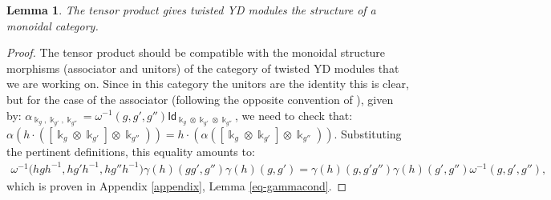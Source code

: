 \documentclass[pdftex]{sigma}
\numberwithin{equation}{section}
\newtheorem{Lemma}[Theorem]{Lemma}
\newcommand{\ide}{\mathsf{Id}}
\begin{document}
 \begin{Lemma}
 The tensor product gives twisted YD modules the structure of a monoidal category.
 \end{Lemma}
 \begin{proof}
 The tensor product should be compatible with the monoidal structure morphisms (associator and unitors) of the category of twisted YD modules that we are working on.
 Since in this category the unitors are the identity this is clear, but for the case of the associator (following the opposite convention of \cite{EGNO}), given by:
$\alpha_{\Bbbk_g,\Bbbk_{g'},\Bbbk_{g''}}=\omega^{-1}(g,g',g'') \ide_{\Bbbk_g \otimes \Bbbk_{g'} \otimes \Bbbk_{g''}}$, we need to check that: $\alpha ( h \cdot ( [ \Bbbk_g \otimes \Bbbk_{g'} ] \otimes \Bbbk_{g''} ) )=h \cdot ( \alpha ( [ \Bbbk_g \otimes \Bbbk_{g'} ] \otimes \Bbbk_{g''} ) )$. Substituting the pertinent definitions, this equality amounts to:
\begin{gather*}
\omega^{-1}\!\big(hgh^{-1}\!,hg'h^{-1}\!,hg''h^{-1}\big) \gamma(h)(gg'\!,g'') \gamma(h)(g,g')=\gamma(h)(g,g'g'') \gamma(h)(g'\!,g'') \omega^{-1}(g,g'\!,g''),
\end{gather*}
which is proven in Appendix \ref{appendix}, Lemma \ref{eq-gammacond}. \end{proof}
\end{document}
